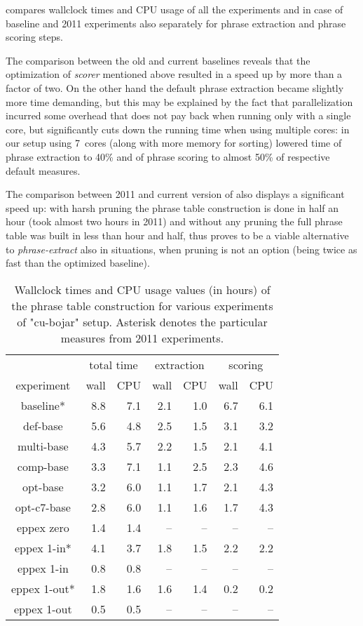  compares wallclock times and CPU usage of all the
experiments and in case of baseline and 2011 experiments also separately for phrase
extraction and phrase scoring steps.

The comparison between the old and current baselines reveals that the optimization of
\emph{scorer} mentioned above resulted in a speed up by more than a factor of two.
On the other hand the default phrase extraction became slightly more time demanding,
but this may be explained by the fact that parallelization incurred some overhead
that does not pay back when running only with a single core, but significantly cuts
down the running time when using multiple cores: in our setup using 7~cores (along with
more memory for sorting) lowered time of phrase extraction to 40\% and of phrase scoring
to almost 50\% of respective default measures.

The comparison between 2011 and current version of \eppex{} also displays a significant
speed up: with harsh pruning the phrase table construction is done in half an hour (took
almost two hours in 2011) and without any pruning the full phrase table was built in
less than hour and half, thus \eppex{} proves to be a viable alternative to
\emph{phrase-extract} also in situations, when pruning is not an option (being twice as
fast than the optimized baseline).

\begin{table}[ht]
\centering
\begin{tabular}{ | c | r r | r r | r r | }
\hline
 & \multicolumn{2}{|c|}{total time} & \multicolumn{2}{|c|}{extraction} & \multicolumn{2}{|c|}{scoring} \\
experiment & wall & CPU & wall & CPU & wall & CPU \\
\hline
\hline
baseline*     & 8.8 & 7.1 & 2.1 & 1.0 & 6.7 & 6.1 \\
def-base      & 5.6 & 4.8 & 2.5 & 1.5 & 3.1 & 3.2 \\
multi-base    & 4.3 & 5.7 & 2.2 & 1.5 & 2.1 & 4.1 \\
comp-base     & 3.3 & 7.1 & 1.1 & 2.5 & 2.3 & 4.6 \\
opt-base      & 3.2 & 6.0 & 1.1 & 1.7 & 2.1 & 4.3 \\
opt-c7-base   & 2.8 & 6.0 & 1.1 & 1.6 & 1.7 & 4.3 \\
eppex zero    & 1.4 & 1.4 & -- & -- & -- & -- \\
\hline
eppex 1-in*   & 4.1 & 3.7 & 1.8 & 1.5 & 2.2 & 2.2 \\
eppex 1-in    & 0.8 & 0.8 & -- & -- & -- & -- \\
\hline
eppex 1-out*  & 1.8 & 1.6 & 1.6 & 1.4 & 0.2 & 0.2 \\
eppex 1-out   & 0.5 & 0.5 & -- & -- & -- & -- \\
\hline
\end{tabular}
\caption{\label{cu-bojar-time-benchmarks}
Wallclock times and CPU usage values (in hours) of the phrase table
construction for various experiments of "cu-bojar" setup.
Asterisk denotes the particular measures from 2011 experiments.}
\end{table}

